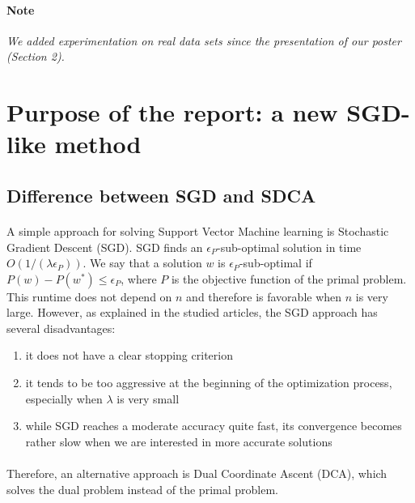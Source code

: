 \documentclass{article}
\begin{document}
\paragraph{Note} \textit{We added experimentation on real data sets since the presentation of our poster (Section 2).}


\section{Purpose of the report: a new SGD-like method}

\subsection{Difference between SGD and SDCA}

\paragraph{}A simple approach for solving Support Vector Machine learning is Stochastic Gradient Descent (SGD).
SGD finds an $\epsilon_P$-sub-optimal solution in time $O(1/(\lambda \epsilon_P))$.
We say that a solution $w$ is $\epsilon_P$-sub-optimal if $P(w) - P(w^{*}) \leq \epsilon_P$, where $P$ is the objective function of the primal problem.
This runtime does not depend on $n$ and therefore is favorable when $n$ is very large.
However, as explained in the studied articles, the SGD approach has several disadvantages:

\begin{enumerate}
    \item it does not have a clear stopping criterion
    \item it tends to be too aggressive at the beginning of the optimization process, especially when $\lambda$ is very small
    \item while SGD reaches a moderate accuracy quite fast, its convergence becomes rather slow when we are interested in more accurate solutions
\end{enumerate}

\paragraph{}Therefore, an alternative approach is Dual Coordinate Ascent (DCA), which solves the dual problem instead of the primal problem.
\end{document}
